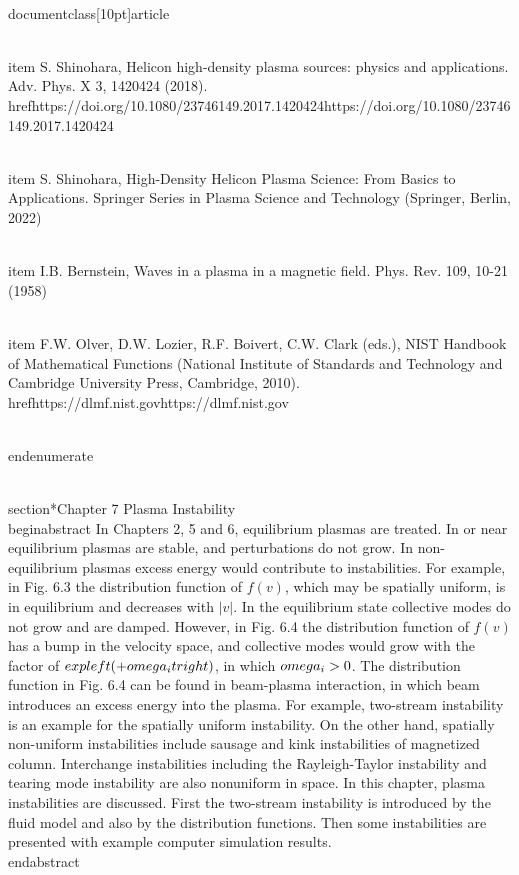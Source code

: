 \\documentclass[10pt]{article}
\begin{document}
{{{{  \\item S. Shinohara, Helicon high-density plasma sources: physics and applications. Adv. Phys. X 3, 1420424 (2018). \\href{https://doi.org/10.1080/23746149.2017.1420424}{https://doi.org/10.1080/23746149.2017.1420424}

  \\item S. Shinohara, High-Density Helicon Plasma Science: From Basics to Applications. Springer Series in Plasma Science and Technology (Springer, Berlin, 2022)

  \\item I.B. Bernstein, Waves in a plasma in a magnetic field. Phys. Rev. 109, 10-21 (1958)

  \\item F.W. Olver, D.W. Lozier, R.F. Boivert, C.W. Clark (eds.), NIST Handbook of Mathematical Functions (National Institute of Standards and Technology and Cambridge University Press, Cambridge, 2010). \\href{https://dlmf.nist.gov}{https://dlmf.nist.gov}

\\end{enumerate}

\\section*{Chapter 7 Plasma Instability }
\\begin{abstract}
In Chapters 2, 5 and 6, equilibrium plasmas are treated. In or near equilibrium plasmas are stable, and perturbations do not grow. In non-equilibrium plasmas excess energy would contribute to instabilities. For example, in Fig. 6.3 the distribution function of $f(v)$, which may be spatially uniform, is in equilibrium and decreases with $|v|$. In the equilibrium state collective modes do not grow and are damped. However, in Fig. 6.4 the distribution function of $f(v)$ has a bump in the velocity space, and collective modes would grow with the factor of $\\exp \\left(+\\omega_{i} t\\right)$, in which $\\omega_{i}>0$. The distribution function in Fig. 6.4 can be found in beam-plasma interaction, in which beam introduces an excess energy into the plasma. For example, two-stream instability is an example for the spatially uniform instability. On the other hand, spatially non-uniform instabilities include sausage and kink instabilities of magnetized column. Interchange instabilities including the Rayleigh-Taylor instability and tearing mode instability are also nonuniform in space. In this chapter, plasma instabilities are discussed. First the two-stream instability is introduced by the fluid model and also by the distribution functions. Then some instabilities are presented with example computer simulation results.
\\end{abstract}

}}}}
\end{document}

